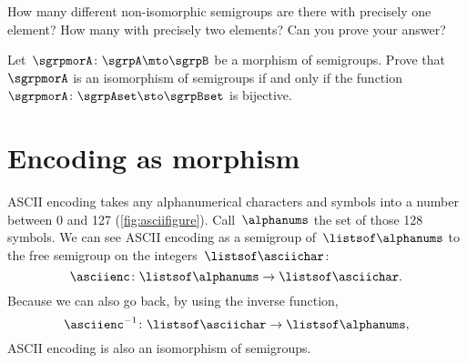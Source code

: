 
\begin{gradedexercise}
    \label{ex:non-isomorphic}
    How many different non-isomorphic semigroups are there with precisely one element?
    How many with precisely two elements?
    Can you prove your answer?
\end{gradedexercise}

\begin{gradedexercise}
    \label{ex:CharacterizeSemigroupIsos}
    \label{ex:semi-morph}
    Let~$\sgrpmorA\colon \sgrpA \mto \sgrpB$ be a morphism of semigroups.
    Prove that~$\sgrpmorA$ is an isomorphism of semigroups if and only if the function~$\sgrpmorA \colon \sgrpAset \sto \sgrpBset$ is bijective.
\end{gradedexercise}

\section{Encoding as morphism }

\begin{example}
    ASCII encoding takes any alphanumerical characters and symbols into a number between 0 and 127 (\cref{fig:asciifigure}).
    Call~$\alphanums$ the set of those 128 symbols.
    We can see ASCII encoding as a semigroup \whomo of~$\listsof\alphanums$ to the free semigroup on the integers~$\listsof\asciichar$:
    \begin{equation}
        \label{eq:ASCII-semi}
        \asciienc\colon \listsof\alphanums \to  \listsof\asciichar.
    \end{equation}
    Because we can also go back, by using the inverse function,
    \begin{equation}
        \label{eq:ASCII-semi-inv}
        \asciienc^{-1}\colon  \listsof\asciichar  \to  \listsof\alphanums,
    \end{equation}
    ASCII encoding is also an isomorphism of semigroups.
\end{example}

